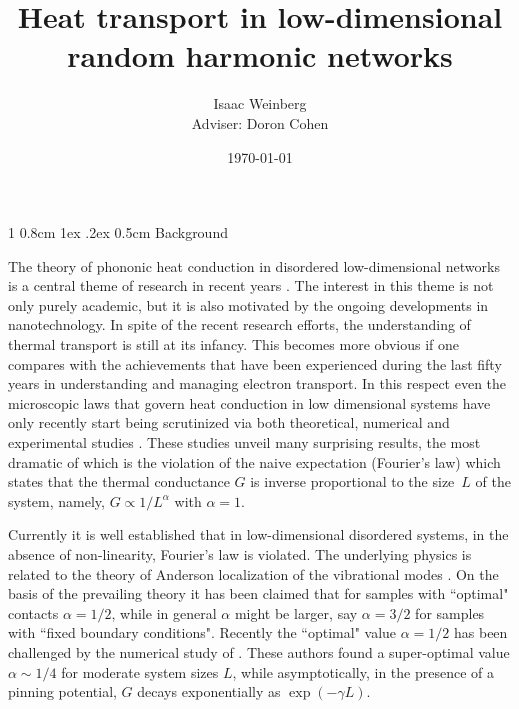 \documentclass[onecolumn,fleqn,notitlepage,secnumarabic]{revtex4}
\makeatletter
\def\section{%
  \@startsection
    {section}%
    {1}%
    {\z@}%
    {0.8cm \@plus1ex \@minus .2ex}%
    {0.5cm}%
    {\Large\bf }%
}%
\makeatother
\begin{document}
\title{Heat transport in low-dimensional random harmonic networks}


\author{ Isaac Weinberg\\Adviser: Doron Cohen }
\date{\today}
\maketitle

\section{Background}

The theory of phononic heat conduction in disordered low-dimensional networks is a central theme of research in recent years \cite{LLP03,
D08,LRWZHL12}. The interest in this theme is not only purely academic, but it is also motivated by the ongoing developments in nanotechnology.
In spite of the recent research efforts, the understanding of thermal transport is still at its infancy. This becomes more obvious if one compares 
with the achievements that have been experienced during the last fifty years in understanding and managing electron transport. In this respect 
even the microscopic laws that govern heat conduction in low dimensional systems have only recently start being scrutinized via both theoretical, 
numerical and experimental studies \cite{LLP03,D08,COGMZ08,NGPB09,LRWZHL12,ZL10,K1,K2}. These studies unveil many surprising results, the most 
dramatic of which is the violation of the naive expectation (Fourier's law) which states that the thermal conductance $G$ is inverse proportional 
to the size~$L$ of the system, namely, $G\propto 1/L^{\alpha}$ with ${\alpha=1}$. 

Currently it is well established that in low-dimensional disordered systems, in the absence of non-linearity, Fourier's law  is violated. The
underlying physics is related to the theory of Anderson localization of the vibrational modes \cite{D08,D01,LXXZL12,DL08,LD05,RD08,LZH01,
KCRDLS10a,KCRDLS10b}. On the basis of the prevailing theory \cite{D08,D01} it has been claimed that for samples with ``optimal" contacts ${\alpha=1/2}$, 
while in general $\alpha$ might be larger, say ${\alpha=3/2}$ for samples with ``fixed boundary conditions". Recently the ``optimal" value 
${\alpha=1/2}$ has been challenged by the numerical study of \cite{BZFK13}. These authors found a super-optimal value ${\alpha \sim 1/4}$ for 
moderate system sizes $L$, while asymptotically, in the presence of a pinning potential, $G$ decays exponentially as ${\exp(-\gamma L)}$. 
\end{document}
